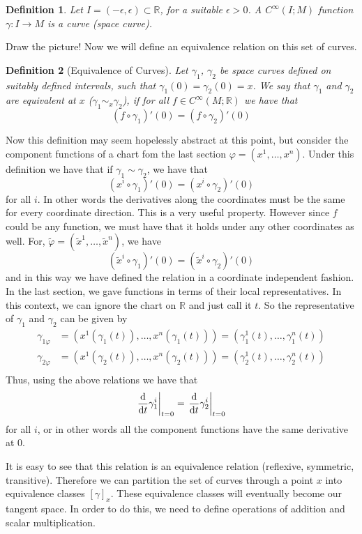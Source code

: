 \documentclass[a4paper]{article}
\newtheorem*{defn}{Definition}
\begin{document}
\begin{defn}
  Let $I = (-\epsilon, \epsilon) \subset \mathds{R}$, for a suitable $\epsilon > 0$. A $C^\infty(I;M)$ function $\gamma: I \rightarrow M$ is a curve (space curve).
\end{defn}
Draw the picture! Now we will define an equivalence relation on this set of curves.

\begin{defn}[Equivalence of Curves]
  Let $\gamma_1$, $\gamma_2$ be space curves defined on suitably defined intervals, such that $\gamma_1(0) = \gamma_2(0) = x$. We say that $\gamma_1$ and $\gamma_2$ are equivalent at $x$ ($\gamma_1 \sim_x \gamma_2$), if for all $f \in C^\infty(M;\mathds{R})$ we have that
  \[
    (f \circ \gamma_1)'(0) = (f \circ \gamma_2)'(0)
  \]
\end{defn}
Now this definition may seem hopelessly abstract at this point, but consider the component functions of a chart fom the last section $\varphi = (x^1, \dots, x^n)$. Under this definition we have that if $\gamma_1 \sim \gamma_2$, we have that
\[
  (x^i \circ \gamma_1)'(0) = (x^i \circ \gamma_2)'(0)
\]
for all $i$. In other words the derivatives along the coordinates must be the same for every coordinate direction. This is a very useful property. However since $f$ could be any function, we must have that it holds under any other coordinates as well. For, $\tilde{\varphi} = (\tilde{x}^1, \dots, \tilde{x}^n)$, we have
\[
  (\tilde{x}^i \circ \gamma_1)'(0) = (\tilde{x}^i \circ \gamma_2)'(0) 
\]
and in this way we have defined the relation in a coordinate independent fashion. In the last section, we gave functions in terms of their local representatives. In this context, we can ignore the chart on $\mathds{R}$ and just call it $t$. So the representative of $\gamma_1$ and $\gamma_2$ can be given by
\[
  \begin{aligned}
    \gamma_{1\varphi} &= (x^1(\gamma_1(t)), \dots, x^n(\gamma_1(t))) = (\gamma^1_1(t), \dots, \gamma^n_1(t)) \\
    \gamma_{2\varphi} &= (x^1(\gamma_2(t)), \dots, x^n(\gamma_2(t))) = (\gamma^1_2(t), \dots, \gamma^n_2(t)) \\
  \end{aligned}
\]
Thus, using the above relations we have that
\[
  \eval{\dv{t}\gamma_1^{i}}_{t=0} = \eval{\dv{t}\gamma_2^{i}}_{t=0}
\]
for all $i$, or in other words all the component functions have the same derivative at 0.

It is easy to see that this relation is an equivalence relation (reflexive, symmetric, transitive). Therefore we can partition the set of curves through a point $x$ into equivalence classes $ \left[ \gamma \right]_x$. These equivalence classes will eventually become our tangent space. In order to do this, we need to define operations of addition and scalar multiplication.
\end{document}
